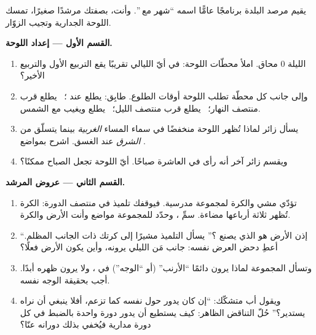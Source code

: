 \begin{problem}\label{pb:g7:moon-phases:1}
يقيم مرصد البلدة برنامجًا عامًّا اسمه ``شهر مع ''. وأنت،
بصفتك مرشدًا صغيرًا، تمسك اللوحة الجدارية وتجيب الزوّار.

\medskip\noindent\textbf{القسم الأول --- إعداد اللوحة.}
\begin{enumerate}
  \item الليلة $0$ محاق. املأ محطّات اللوحة: في أيّ الليالي
        تقريبًا يقع التربيع الأول  والتربيع الأخير؟
  \item وإلى جانب كل محطّة تطلب اللوحة أوقات الطلوع. طابِق:
        يطلع عند ؛ \ يطلع قرب منتصف النهار؛ \ يطلع قرب
        منتصف الليل؛ \ يطلع ويغيب مع الشمس.
  \item يسأل زائر لماذا تُظهر اللوحة  منخفضًا في سماء
        المساء \emph{الغربية} بينما  يتسلّق من
        \emph{الشرق} عند الغسق. اشرح بمواضع .
  \item ويقسم زائر آخر أنه رأى  في العاشرة صباحًا. أيّ
         اللوحة تجعل  الصباح ممكنًا؟
\end{enumerate}

\medskip\noindent\textbf{القسم الثاني --- عروض المرشد.}
\begin{enumerate}[resume]
  \item تؤدّي مشي  والكرة لمجموعة مدرسية. فيوقفك تلميذ
        في منتصف الدورة: الكرة تُظهر ثلاثة أرباعها مضاءة. سمِّ
        ، وحدّد للمجموعة مواضع  وأنت الأرض والكرة.
  \item ``إذن  الأرض هو الذي يصنع ؟'' يسأل التلميذ
        مشيرًا إلى كرتك ذات الجانب المظلم. أعطِ دحض العرض
        نفسه: جانب مَن الليلي يرونه، وأين يكون  الأرض
        فعلًا؟
  \item وتسأل المجموعة لماذا يرون دائمًا ``الأرنب'' (أو
        ``الوجه'') في ، ولا يرون ظهره أبدًا. أجب بحقيقة
        الوجه نفسه.
  \item ويقول أب متشكّك: ``إن كان  يدور حول نفسه كما
        تزعم، أفلا ينبغي أن نراه يستدير؟'' حُلّ التناقض
        الظاهر: كيف يستطيع  أن يدور دورة واحدة بالضبط في
        كل دورة مدارية فيُخفي بذلك دورانه عنّا؟
\end{enumerate}


\end{problem}

